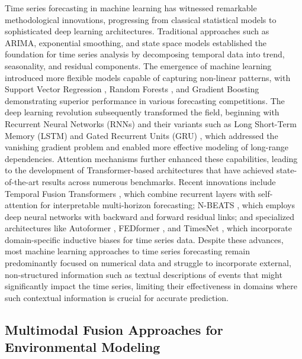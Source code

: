 Time series forecasting in machine learning has witnessed remarkable methodological innovations, progressing from classical statistical models to sophisticated deep learning architectures. Traditional approaches such as ARIMA, exponential smoothing, and state space models \cite{hyndman2018forecasting} established the foundation for time series analysis by decomposing temporal data into trend, seasonality, and residual components. The emergence of machine learning introduced more flexible models capable of capturing non-linear patterns, with Support Vector Regression \cite{smola2004tutorial}, Random Forests \cite{breiman2001random}, and Gradient Boosting \cite{friedman2001greedy} demonstrating superior performance in various forecasting competitions. The deep learning revolution subsequently transformed the field, beginning with Recurrent Neural Networks (RNNs) and their variants such as Long Short-Term Memory (LSTM) \cite{hochreiter1997long} and Gated Recurrent Units (GRU) \cite{cho2014learning}, which addressed the vanishing gradient problem and enabled more effective modeling of long-range dependencies. Attention mechanisms \cite{vaswani2017attention} further enhanced these capabilities, leading to the development of Transformer-based architectures that have achieved state-of-the-art results across numerous benchmarks. Recent innovations include Temporal Fusion Transformers \cite{lim2021temporal}, which combine recurrent layers with self-attention for interpretable multi-horizon forecasting; N-BEATS \cite{oreshkin2019n}, which employs deep neural networks with backward and forward residual links; and specialized architectures like Autoformer \cite{wu2021autoformer}, FEDformer \cite{zhou2022fedformer}, and TimesNet \cite{zhou2022timesnet}, which incorporate domain-specific inductive biases for time series data. Despite these advances, most machine learning approaches to time series forecasting remain predominantly focused on numerical data and struggle to incorporate external, non-structured information such as textual descriptions of events that might significantly impact the time series, limiting their effectiveness in domains where such contextual information is crucial for accurate prediction.

\subsection{Multimodal Fusion Approaches for Environmental Modeling}
\label{subsec:multimodal_fusion}

